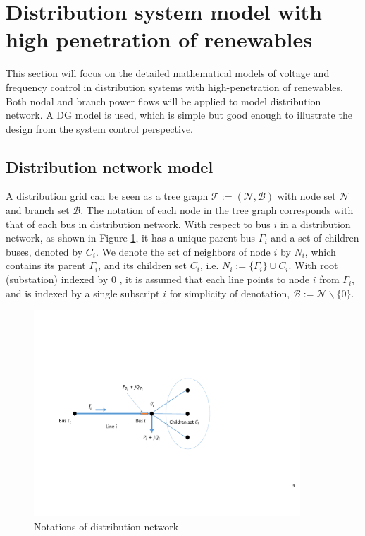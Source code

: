 \documentclass{article}
\begin{document}
\newpage

\section{Distribution system model with high penetration of renewables}
This section will focus on the detailed mathematical models of voltage and frequency control in distribution systems with high-penetration of renewables. Both nodal and branch power flows will be applied to model distribution network. A DG model \cite{xin2011co} is used, which is simple but good enough to illustrate the design from the system control perspective.

\subsection{Distribution network model}

A distribution grid can be seen as a tree graph $\mathcal{T} := (\mathcal{N}, \mathcal{B})$ with node set $ \mathcal{N}$ and branch set  $ \mathcal{B}$. The notation of each node in the tree graph corresponds with that of each bus in distribution network. With respect to bus $i$ in a distribution network, as shown in Figure \ref{fig:busI}, it has a unique parent bus $\Gamma_i$ and a set of children buses, denoted by $C_i$. We denote the set of neighbors of node $i$ by $N_i$, which contains its parent $\Gamma_i$, and its children set $C_i$, i.e. $N_i:= \{\Gamma_i\}\cup C_i$. With root (substation) indexed by $0$ , it is assumed that each line points to node $i$ from $\Gamma_i$, and is indexed by a single subscript $i$ for simplicity of denotation,  $\mathcal{B} := \mathcal{N} \backslash \{0\}$. 
\begin{figure}[ht]
    \centering
    \includegraphics[width=10cm]{pics/distflow.pdf}
    \caption{Notations of distribution network}
    \label{fig:busI}
\end{figure}
\end{document}

